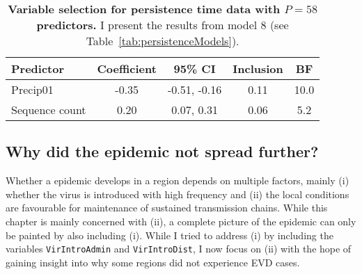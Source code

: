 \begin{minipage}{\textwidth}    
\setcounter{mpfootnote}{\value{footnote}}
\renewcommand{\thempfootnote}{\arabic{mpfootnote}}
\fontsize{9}{11}\selectfont
{}
\begin{longtable}{lcccc}
\caption{\textbf{Variable selection for persistence time data with $P = 58$ predictors.}
I present the results from model 8 (see Table~\ref{tab:persistenceModels}).}
\label{tab:persistence_bigP_results}\\
\toprule
Predictor\footnotemark[1] & Coefficient\footnotemark[2] & 95\% CI\footnotemark[3] & Inclusion\footnotemark[4] & BF\footnotemark[5] \\
\toprule
Precip01 & -0.35 & -0.51, -0.16 & 0.11 & 10.0 \\
\hline
Sequence count & 0.20 & 0.07, 0.31 & 0.06 & 5.2\\
\bottomrule
\end{longtable}
\setcounter{footnote}{\value{mpfootnote}}
\end{minipage}

\subsection*{Why did the epidemic not spread further?}

Whether a epidemic develops in a region depends on multiple factors, mainly (i) whether the virus is introduced with high frequency and (ii) the local conditions are favourable for maintenance of sustained transmission chains.
While this chapter is mainly concerned with (ii), a complete picture of the epidemic can only be painted by also including (i).
While I tried to address (i) by including the variables \verb|VirIntroAdmin| and \verb|VirIntroDist|, I now focus on (ii) with the hope of gaining insight into why some regions did not experience EVD cases.

